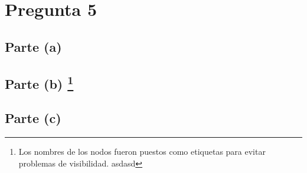 \documentclass[11pt,letterpaper]{article}
\begin{document}
\section{Pregunta 5}
\subsection{Parte (a)}
\renewcommand{\thefootnote}{\fnsymbol{footnote}}
\subsection{Parte (b) \protect\footnote{Los nombres de los nodos fueron puestos como etiquetas para evitar problemas de visibilidad. asdasd}}


\newpage
\subsection{Parte (c)}
\end{document}
